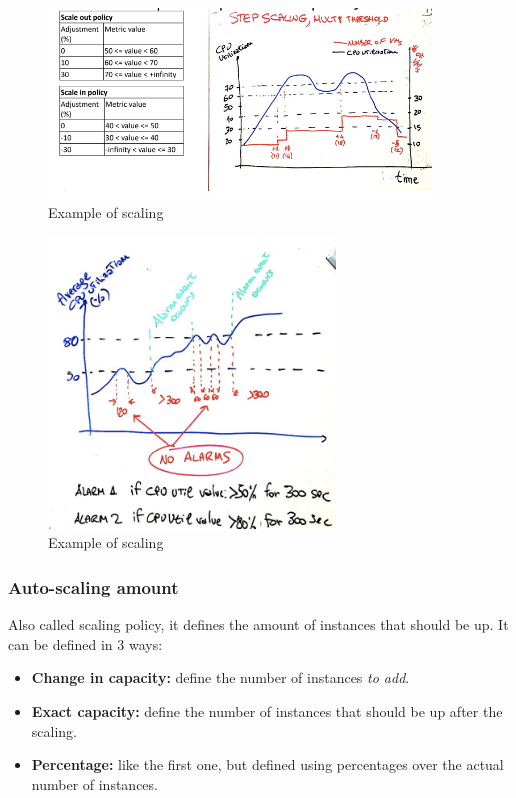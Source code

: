 \documentclass{article}
\begin{document}
\begin{figure}[H]
    \centering
    \includegraphics[width=4in]{imgs/exampleofscaling1.PNG}
    \caption{Example of scaling}
    \label{fig:eos1}
\end{figure}

\begin{figure}[H]
    \centering
    \includegraphics[width=3in]{imgs/exampleofscaling2.PNG}
    \caption{Example of scaling}
    \label{fig:eos2}
\end{figure}

\subsubsection{Auto-scaling amount}
Also called scaling policy, it defines the amount of instances that should be up. It can be defined in 3 ways:
\begin{itemize}
    \item \textbf{Change in capacity:} define the number of instances \textit{to add}.
    \item \textbf{Exact capacity:} define the number of instances that should be up after the scaling.
    \item \textbf{Percentage:} like the first one, but defined using percentages over the actual number of instances.
\end{itemize}
\end{document}
